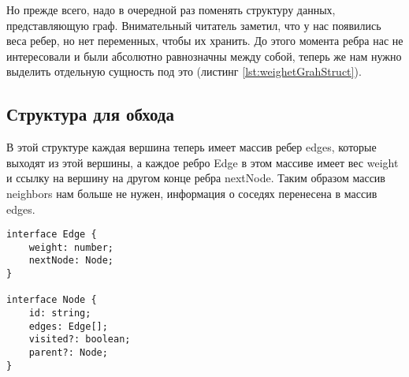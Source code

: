 \documentclass[../article.tex]{subfiles}
\begin{document}
Но прежде всего, надо в очередной раз поменять структуру данных, представляющую граф. Внимательный читатель заметил, что у нас появились веса ребер, но нет переменных, чтобы их хранить. До этого момента ребра нас не интересовали и были абсолютно равнозначны между собой, теперь же нам нужно выделить отдельную сущность под это (листинг \ref{lst:weighetGrahStruct}).

\subsection{Структура для обхода}

В этой структуре каждая вершина теперь имеет массив ребер {\firacodebold edges}, которые выходят из этой вершины, а каждое ребро {\firacodebold Edge} в этом массиве имеет вес {\firacodebold weight} и ссылку на вершину на другом конце ребра {\firacodebold nextNode}. Таким образом массив {\firacodebold neighbors} нам больше не нужен, информация о соседях перенесена в массив {\firacodebold edges}.

\begin{ruledelement}
    \begin{lstlisting}[caption={Структура для взвешенного графа}, label={lst:weighetGrahStruct}]
interface Edge {
    weight: number;
    nextNode: Node;
}

interface Node {
    id: string;
    edges: Edge[];
    visited?: boolean;
    parent?: Node;
}
    \end{lstlisting}
\end{ruledelement}
\end{document}
